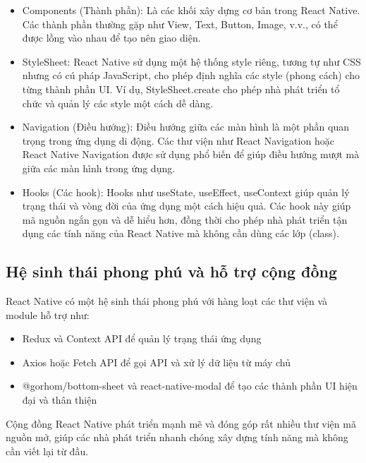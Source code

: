 \documentclass[a4paper]{report}
\begin{document}
\begin{itemize}
    \item Components (Thành phần): Là các khối xây dựng cơ bản trong React Native. Các thành phần thường gặp như View, Text, Button, Image, v.v., có thể được lồng vào nhau để tạo nên giao diện.
    
    \item StyleSheet: React Native sử dụng một hệ thống style riêng, tương tự như CSS nhưng có cú pháp JavaScript, cho phép định nghĩa các style (phong cách) cho từng thành phần UI. Ví dụ, StyleSheet.create cho phép nhà phát triển tổ chức và quản lý các style một cách dễ dàng.
    
    \item Navigation (Điều hướng): Điều hướng giữa các màn hình là một phần quan trọng trong ứng dụng di động. Các thư viện như React Navigation hoặc React Native Navigation được sử dụng phổ biến để giúp điều hướng mượt mà giữa các màn hình trong ứng dụng.
    
    \item Hooks (Các hook): Hooks như useState, useEffect, useContext giúp quản lý trạng thái và vòng đời của ứng dụng một cách hiệu quả. Các hook này giúp mã nguồn ngắn gọn và dễ hiểu hơn, đồng thời cho phép nhà phát triển tận dụng các tính năng của React Native mà không cần dùng các lớp (class).
\end{itemize}

\subsection{Hệ sinh thái phong phú và hỗ trợ cộng đồng}

React Native có một hệ sinh thái phong phú với hàng loạt các thư viện và module hỗ trợ như:

\begin{itemize}
    \item Redux và Context API để quản lý trạng thái ứng dụng
    \item Axios hoặc Fetch API để gọi API và xử lý dữ liệu từ máy chủ
    \item @gorhom/bottom-sheet và react-native-modal để tạo các thành phần UI hiện đại và thân thiện
\end{itemize}

\medskip

Cộng đồng React Native phát triển mạnh mẽ và đóng góp rất nhiều thư viện mã nguồn mở, giúp các nhà phát triển nhanh chóng xây dựng tính năng mà không cần viết lại từ đầu.
\end{document}
